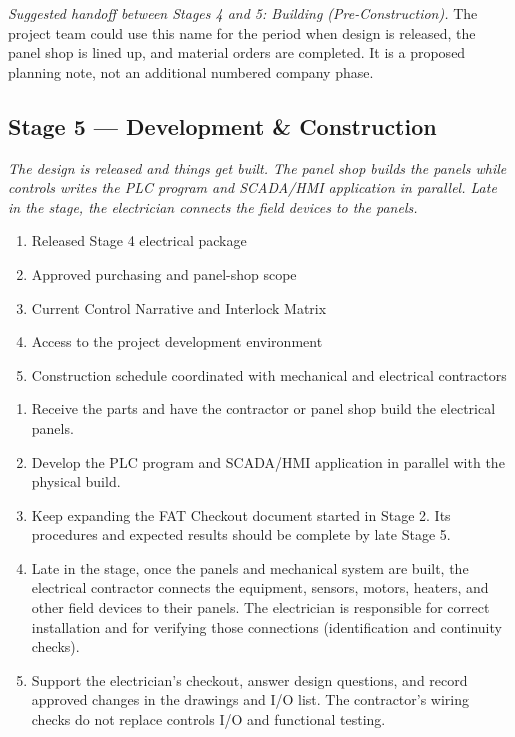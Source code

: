 \noindent\textit{Suggested handoff between Stages 4 and 5: Building (Pre-Construction).} The project team could use this name for the period when design is released, the panel shop is lined up, and material orders are completed. It is a proposed planning note, not an additional numbered company phase.

\subsection{Stage 5 --- Development \& Construction}
\textit{The design is released and things get built. The panel shop builds the panels while controls writes the PLC program and SCADA/HMI application in parallel. Late in the stage, the electrician connects the field devices to the panels.}

\begin{enumerate}[itemsep=1pt]
  \item Released Stage 4 electrical package
  \item Approved purchasing and panel-shop scope
  \item Current Control Narrative and Interlock Matrix
  \item Access to the project development environment
  \item Construction schedule coordinated with mechanical and electrical contractors
\end{enumerate}

\begin{enumerate}[itemsep=1pt]
  \item Receive the parts and have the contractor or panel shop build the electrical panels.
  \item Develop the PLC program and SCADA/HMI application in parallel with the physical build.
  \item Keep expanding the FAT Checkout document started in Stage 2. Its procedures and expected results should be complete by late Stage 5.
  \item Late in the stage, once the panels and mechanical system are built, the electrical contractor connects the equipment, sensors, motors, heaters, and other field devices to their panels. The electrician is responsible for correct installation and for verifying those connections (identification and continuity checks).
  \item Support the electrician's checkout, answer design questions, and record approved changes in the drawings and I/O list. The contractor's wiring checks do not replace controls I/O and functional testing.
\end{enumerate}

